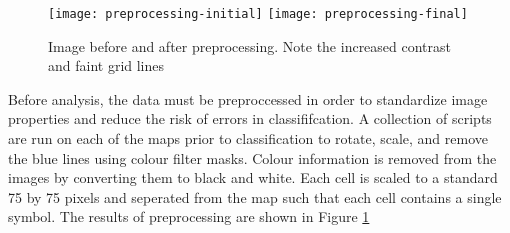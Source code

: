 \begin{figure}[h]
    \begin{center}
    \texttt{[image: preprocessing-initial]}
    \texttt{[image: preprocessing-final]}
    \label{figure:preprocess}
    \caption{Image before and after preprocessing. Note the increased contrast and faint grid lines}
    \end{center}
\end{figure}

Before analysis, the data must be preproccessed in order to standardize image
properties and reduce the risk of errors in classififcation. A collection
of scripts are run on each of the maps prior to classification to
rotate, scale, and remove the blue lines using colour filter masks.
Colour information is removed from the images by converting them to black
and white. Each cell is scaled to a standard 75 by 75 pixels and
seperated from the map such that each cell contains a single symbol.
The results of preprocessing are shown in Figure \ref{figure:preprocess}

